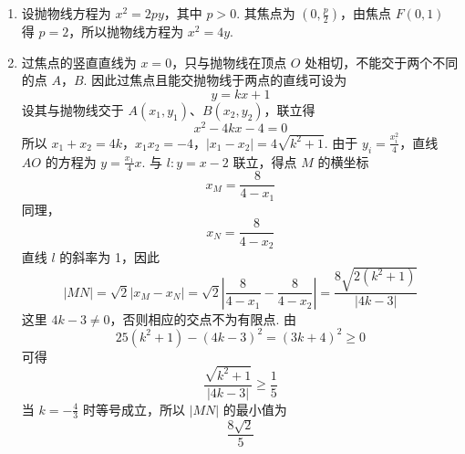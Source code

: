 \begin{solution}
\begin{enumerate}
\item 设抛物线方程为 \(x^2=2py\)，其中 \(p>0\). 其焦点为 \((0,\frac{p}{2})\)，由焦点 \(F(0,1)\) 得 \(p=2\)，所以抛物线方程为 \(x^2=4y\).

\item 过焦点的竖直直线为 \(x=0\)，只与抛物线在顶点 \(O\) 处相切，不能交于两个不同的点 \(A\)，\(B\). 因此过焦点且能交抛物线于两点的直线可设为
\[
y=kx+1
\]
设其与抛物线交于 \(A(x_1,y_1)\)、\(B(x_2,y_2)\)，联立得
\[
x^2-4kx-4=0
\]
所以
\(x_1+x_2=4k\)，\(x_1x_2=-4\)，\(|x_1-x_2|=4\sqrt{k^2+1}\).
由于 \(y_i=\frac{x_i^2}{4}\)，直线 \(AO\) 的方程为 \(y=\frac{x_1}{4}x\). 与 \(l:y=x-2\) 联立，得点 \(M\) 的横坐标
\[
x_M=\frac{8}{4-x_1}
\]
同理，
\[
x_N=\frac{8}{4-x_2}
\]
直线 \(l\) 的斜率为 1，因此
\[
|MN|=\sqrt2|x_M-x_N|=\sqrt2\left|\frac{8}{4-x_1}-\frac{8}{4-x_2}\right|=\frac{8\sqrt{2(k^2+1)}}{|4k-3|}
\]
这里 \(4k-3\ne0\)，否则相应的交点不为有限点. 由
\[
25(k^2+1)-(4k-3)^2=(3k+4)^2\geqslant0
\]
可得
\[
\frac{\sqrt{k^2+1}}{|4k-3|}\geqslant\frac15
\]
当 \(k=-\frac43\) 时等号成立，所以 \(|MN|\) 的最小值为
\[
\frac{8\sqrt2}{5}
\]
\end{enumerate}
\end{solution}
